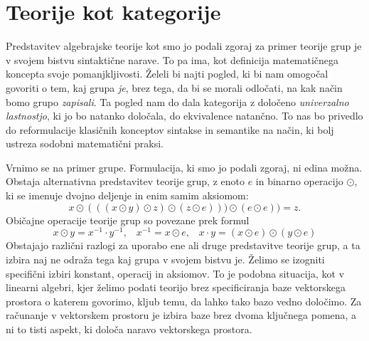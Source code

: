 \documentclass[../kategoricna_logika.tex]{subfiles}
\begin{document}
\section{Teorije kot kategorije}
\label{sec:teorije-kot-kategorije}
Predstavitev algebrajske teorije kot smo jo podali zgoraj za primer
teorije grup je v svojem bistvu sintaktične narave. To pa ima,
kot definicija matematičnega koncepta svoje pomanjkljivosti.
Želeli bi najti pogled, ki bi nam omogočal govoriti o tem,
kaj grupa \emph{je}, brez tega, da bi se morali odločati,
na kak način bomo grupo \emph{zapisali}.
Ta pogled nam do dala kategorija z določeno \emph{univerzalno lastnostjo},
ki jo bo natanko določala, do ekvivalence natančno.
To nas bo privedlo do reformulacije klasičnih konceptov
sintakse in semantike na način, ki bolj ustreza sodobni matematični praksi.

Vrnimo se na primer grupe. Formulacija, ki smo jo podali zgoraj,
ni edina možna. Obstaja alternativna predstavitev teorije grup,
z enoto $e$ in binarno operacijo $\odot$,
ki se imenuje dvojno deljenje in enim samim aksiomom:
$$x \odot (((x \odot y ) \odot z ) \odot ( z \odot e))) \odot (e \odot e) ) = z.$$
Običajne operacije teorije grup so povezane prek formul
$$x \odot y = x^{-1} \cdot y^{-1} \text{,} \quad x^{-1} = x \odot e \text{,} \quad x \cdot y = (x \odot e) \odot (y \odot e)$$
%
Obstajajo različni razlogi za uporabo ene ali druge predstavitve
teorije grup, a ta izbira naj ne odraža tega kaj grupa v svojem bistvu je.
Želimo se izogniti specifični izbiri konstant, operacij in aksiomov.
To je podobna situacija, kot v linearni algebri, kjer želimo podati
teorijo brez specificiranja baze vektorskega prostora o katerem govorimo,
kljub temu, da lahko tako bazo vedno določimo. Za računanje v vektorskem
prostoru je izbira baze brez dvoma ključnega pomena, a ni to tisti
aspekt, ki določa naravo vektorskega prostora.
\end{document}

